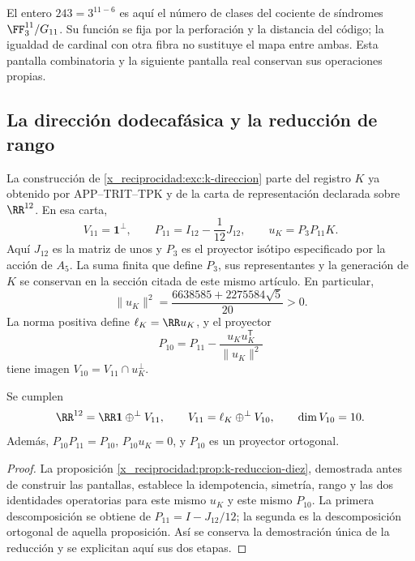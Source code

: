 El entero \(243=3^{11-6}\) es aquí el número de clases
del cociente de síndromes \(\FF_3^{11}/G_{11}\). Su
función se fija por la perforación y la distancia del
código; la igualdad de cardinal con otra fibra no sustituye
el mapa entre ambas. Esta pantalla combinatoria y la
siguiente pantalla real conservan sus operaciones propias.

\subsection{La dirección dodecafásica y la reducción de rango}

La construcción de \ref{x_reciprocidad:exc:k-direccion} parte del registro
\(K\) ya obtenido por APP--TRIT--TPK y de la carta de
representación declarada sobre \(\RR^{12}\). En esa carta,
\begin{equation}
 V_{11}=\mathbf1^\perp,\qquad
 P_{11}=I_{12}-\frac1{12}J_{12},\qquad
 u_K=P_3P_{11}K.
 \label{x_reciprocidad:iv:eq:p11-uk}
\end{equation}
Aquí \(J_{12}\) es la matriz de unos y \(P_3\) es el
proyector isótipo especificado por la acción de \(A_5\).
La suma finita que define \(P_3\), sus representantes y la
generación de \(K\) se conservan en la sección citada de
este mismo artículo. En particular,
\[
 \|u_K\|^2=\frac{6638585+2275584\sqrt5}{20}>0.
\]
La norma positiva define \(\ell_K=\RR u_K\), y el
proyector
\begin{equation}
 P_{10}=P_{11}-\frac{u_Ku_K^{\mathsf T}}{\|u_K\|^2}
 \label{x_reciprocidad:iv:eq:p10}
\end{equation}
tiene imagen \(V_{10}=V_{11}\cap u_K^\perp\).

\begin{proposition}
\label{x_reciprocidad:iv:prop:12-11-10}
Se cumplen
\[
 \RR^{12}=\RR\mathbf1\mathbin{\oplus^\perp}V_{11},\qquad
 V_{11}=\ell_K\mathbin{\oplus^\perp}V_{10},\qquad
 \dim V_{10}=10.
\]
Además, \(P_{10}P_{11}=P_{10}\), \(P_{10}u_K=0\), y
\(P_{10}\) es un proyector ortogonal.
\end{proposition}
\begin{proof}
La proposición \ref{x_reciprocidad:prop:k-reduccion-diez}, demostrada antes de
construir las pantallas, establece la idempotencia, simetría, rango y
las dos identidades operatorias para este mismo \(u_K\) y este mismo
\(P_{10}\). La primera descomposición se obtiene de
\(P_{11}=I-J_{12}/12\); la segunda es la descomposición ortogonal
de aquella proposición. Así se conserva la demostración única de la
reducción y se explicitan aquí sus dos etapas.
\end{proof}

